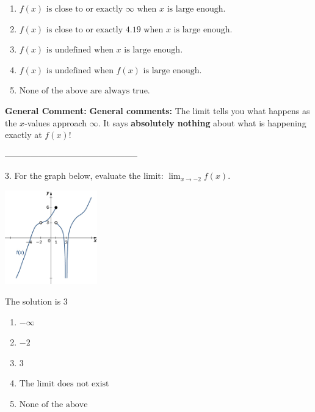 \documentclass{extbook}[14pt]
\begin{document}
\begin{enumerate}[label=\Alph*.] 
\item $ f(x) \text{ is close to or exactly } \infty \text{ when } x \text{ is large enough}. $ 

  
\item $ f(x) \text{ is close to or exactly } 4.19 \text{ when } x \text{ is large enough}. $ 

  
\item $ f(x) \text{ is undefined when } x \text{ is large enough}. $ 

  
\item $ f(x) \text{ is undefined when } f(x) \text{ is large enough}. $ 

  
\item $ \text{None of the above are always true.} $ 

  
\end{enumerate} 
 
\textbf{General Comment:} \textbf{General comments:} The limit tells you what happens as the $x$-values approach $\infty$. It says \textbf{absolutely nothing} about what is happening exactly at $f(x)$! 

-----------------------------------------------

3. For the graph below, evaluate the limit: $ \displaystyle \lim_{x \rightarrow -2} f(x)$.
\begin{center} \includegraphics[width=0.3\textwidth]{../Figures/evaluateLimitGraphicallyA.png} \end{center} 

The solution is $ 3 $ 

\begin{enumerate}[label=\Alph*.] 
\item $ -\infty $ 

  
\item $ -2 $ 

  
\item $ 3 $ 

  
\item $ \text{The limit does not exist} $ 

  
\item $ \text{None of the above} $ 

  
\end{enumerate} 
 
\end{document}
